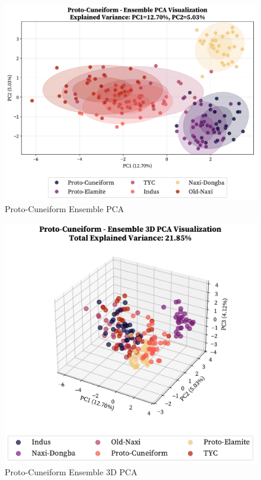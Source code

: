 \documentclass[11pt,a4paper,oneside]{report}
\begin{document}
\begin{figure}[H] 
    \centering
    \includegraphics[width=0.8\linewidth]{Visualizations/PCA/Proto-Cuneiform/ensemble_pca.pdf}
     \caption*{Proto-Cuneiform Ensemble PCA}
\end{figure}

\begin{figure}[H] 
    \centering
    \includegraphics[width=0.8\linewidth]{Visualizations/PCA/Proto-Cuneiform/ensemble_pca_3d.pdf}
     \caption*{Proto-Cuneiform Ensemble 3D PCA}
\end{figure}
\end{document}
